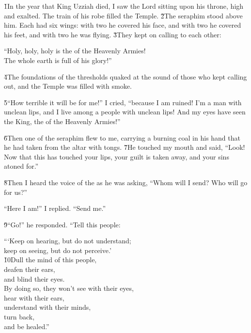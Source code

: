 \v{1}In the year that King Uzziah died, I saw the Lord sitting upon his throne, high and exalted. The train of his robe filled the Temple. \v{2}The seraphim stood above him. Each had six wings: with two he covered his face, and with two he covered his feet, and with two he was flying. \v{3}They kept on calling to each other:

\begin{poetry}
\poeml ``Holy, holy, holy is the  of the Heavenly Armies! \\
\poemll    The whole earth is full of his glory!''
\end{poetry}

\v{4}The foundations of the thresholds quaked at the sound of those who kept calling out, and the Temple was filled with smoke.

\v{5}``How terrible it will be for me!'' I cried, ``because I am ruined! I'm a man with unclean lips, and I live among a people with unclean lips! And my eyes have seen the King, the  of the Heavenly Armies!''

\v{6}Then one of the seraphim flew to me, carrying a burning coal in his hand that he had taken from the altar with tongs. \v{7}He touched my mouth and said, ``Look! Now that this has touched your lips, your guilt is taken away, and your sins atoned for.''

\v{8}Then I heard the voice of the  as he was asking, ``Whom will I send? Who will go for us?''

``Here I am!'' I replied. ``Send me.''

\v{9}``Go!'' he responded. ``Tell this people:

\begin{poetry}
\poeml ```Keep on hearing, but do not understand; \\
\poemll    keep on seeing, but do not perceive.' \\
\poeml \v{10}Dull the mind of this people, \\
\poemll    deafen their ears, \\
\poemlll       and blind their eyes. \\
\poeml By doing so, they won't see with their eyes, \\
\poemll    hear with their ears, \\
\poeml understand with their minds, \\
\poemll    turn back, \\
\poemlll       and be healed.''
\end{poetry}

